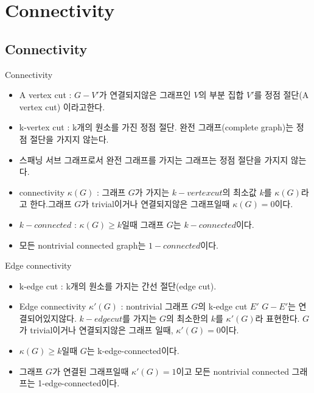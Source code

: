 \section{Connectivity}

\subsection{Connectivity}

\begin{dfn}[Connectivity] 
    Connectivity
    \begin{itemize}
        \item A vertex cut : $G-V'$가 연결되지않은 그래프인 $V$의 부분 집합 $V'$를 정점 절단(A vertex cut) 이라고한다.
        \item k-vertex cut : k개의 원소를 가진 정점 절단. 완전 그래프(complete graph)는 정점 절단을 가지지 않는다.
        \item 스패닝 서브 그래프로서 완전 그래프를 가지는 그래프는 정점 절단을 가지지 않는다.
        \item  connectivity $\kappa(G)$ : 그래프 $G$가 가지는 $k-vertex cut$의 최소값 $k$를 $\kappa(G)$라고 한다.그래프 $G$가 trivial이거나 연결되지않은 그래프일때 $\kappa(G) = 0$이다.
        \item $k-connected$ :  $\kappa(G) \ge k$일때 그래프 $G$는 $k-connected$이다. 
        \item 모든 nontrivial connected graph는 $1-connected$이다.
    \end{itemize}
\end{dfn}

\begin{dfn}
    Edge connectivity 
    \begin{itemize}
        \item k-edge cut : k개의 원소를 가지는 간선 절단(edge cut).
        \item Edge connectivity $\kappa'(G)$ : nontrivial 그래프 $G$의 k-edge cut $E'$ $G-E'$는 연결되어있지않다. $k-edge cut$를 가지는 $G$의 최소한의 $k$를 $\kappa'(G)$라 표현한다. $G$가 trivial이거나 연결되지않은 그래프 일때, $\kappa'(G) = 0$이다.
        \item $\kappa(G) \ge k$일때 $G$는 k-edge-connected이다.
        \item 그래프 $G$가 연결된 그래프일때  $\kappa'(G)= 1$이고 모든 nontrivial connected 그래프는 1-edge-connected이다.
    \end{itemize}
\end{dfn}

